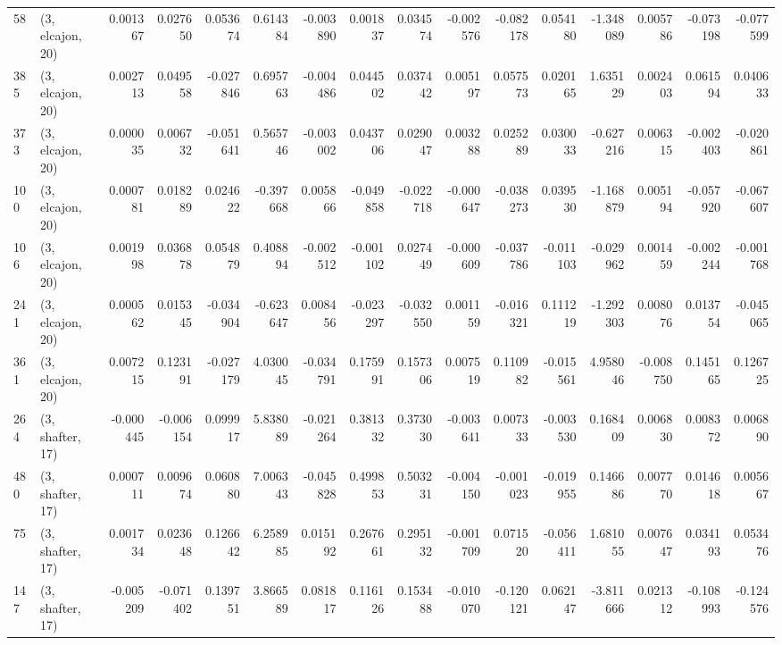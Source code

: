 \begin{tabular}{llrrrrrrrrrrrrrr}
58  &  (3, elcajon, 20) &   0.001367 &  0.027650 &  0.053674 &     0.614384 &  -0.003890 &   0.001837 &   0.034574 & -0.002576 & -0.082178 &  0.054180 &   -1.348089 &  0.005786 & -0.073198 & -0.077599 \\
385 &  (3, elcajon, 20) &   0.002713 &  0.049558 & -0.027846 &     0.695763 &  -0.004486 &   0.044502 &   0.037442 &  0.005197 &  0.057573 &  0.020165 &    1.635129 &  0.002403 &  0.061594 &  0.040633 \\
373 &  (3, elcajon, 20) &   0.000035 &  0.006732 & -0.051641 &     0.565746 &  -0.003002 &   0.043706 &   0.029047 &  0.003288 &  0.025289 &  0.030033 &   -0.627216 &  0.006315 & -0.002403 & -0.020861 \\
100 &  (3, elcajon, 20) &   0.000781 &  0.018289 &  0.024622 &    -0.397668 &   0.005866 &  -0.049858 &  -0.022718 & -0.000647 & -0.038273 &  0.039530 &   -1.168879 &  0.005194 & -0.057920 & -0.067607 \\
106 &  (3, elcajon, 20) &   0.001998 &  0.036878 &  0.054879 &     0.408894 &  -0.002512 &  -0.001102 &   0.027449 & -0.000609 & -0.037786 & -0.011103 &   -0.029962 &  0.001459 & -0.002244 & -0.001768 \\
241 &  (3, elcajon, 20) &   0.000562 &  0.015345 & -0.034904 &    -0.623647 &   0.008456 &  -0.023297 &  -0.032550 &  0.001159 & -0.016321 &  0.111219 &   -1.292303 &  0.008076 &  0.013754 & -0.045065 \\
361 &  (3, elcajon, 20) &   0.007215 &  0.123191 & -0.027179 &     4.030045 &  -0.034791 &   0.175991 &   0.157306 &  0.007519 &  0.110982 & -0.015561 &    4.958046 & -0.008750 &  0.145165 &  0.126725 \\
264 &  (3, shafter, 17) &  -0.000445 & -0.006154 &  0.099917 &     5.838089 &  -0.021264 &   0.381332 &   0.373030 & -0.003641 &  0.007333 & -0.003530 &    0.168409 &  0.006830 &  0.008372 &  0.006890 \\
480 &  (3, shafter, 17) &   0.000711 &  0.009674 &  0.060880 &     7.006343 &  -0.045828 &   0.499853 &   0.503231 & -0.004150 & -0.001023 & -0.019955 &    0.146686 &  0.007770 &  0.014618 &  0.005667 \\
75  &  (3, shafter, 17) &   0.001734 &  0.023648 &  0.126642 &     6.258985 &   0.015192 &   0.267661 &   0.295132 & -0.001709 &  0.071520 & -0.056411 &    1.681055 &  0.007647 &  0.034193 &  0.053476 \\
147 &  (3, shafter, 17) &  -0.005209 & -0.071402 &  0.139751 &     3.866589 &   0.081817 &   0.116126 &   0.153488 & -0.010070 & -0.120121 &  0.062147 &   -3.811666 &  0.021312 & -0.108993 & -0.124576 \\

\end{tabular}
